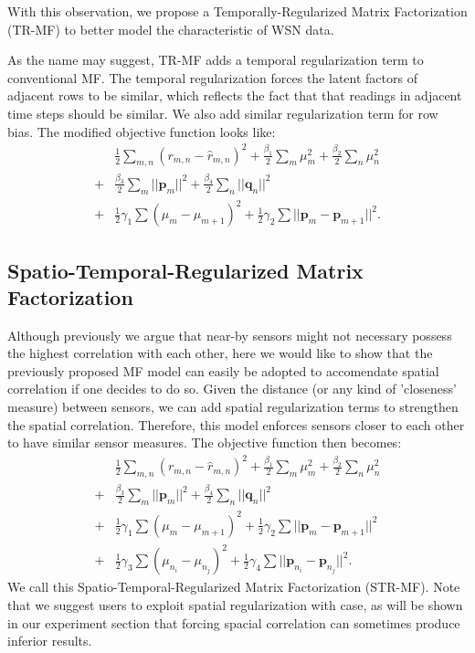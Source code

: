 With this observation, we propose a Temporally-Regularized Matrix Factorization (TR-MF) to better model the characteristic of WSN data. 

As the name may suggest, TR-MF adds a temporal regularization term to conventional MF.
The temporal regularization forces the latent factors of adjacent rows to be similar, which reflects the fact that that readings in adjacent time steps should be similar. We also add similar regularization term for row bias.
The modified objective function looks like: 
\begin{equation*}\begin{aligned}
&\frac{1}{2}\sum_{m,n}{(r_{m,n} - \hat{r}_{m,n})}^2 + \frac{\beta_1}{2}\sum_m{\mu_m^2} + \frac{\beta_2}{2}\sum_n{\mu_n^2}\\
+& \frac{\beta_3}{2}\sum_m{||\mathbf{p}_m||^2} + \frac{\beta_4}{2}\sum_n{||\mathbf{q}_n||^2}\\
+& \frac{1}{2}\gamma_1\sum{(\mu_m-\mu_{m+1})^2} 
+ \frac{1}{2}\gamma_2\sum{||\mathbf{p}_m-\mathbf{p}_{m+1}||^2}.
\end{aligned}\end{equation*}

\subsection{Spatio-Temporal-Regularized Matrix Factorization}
Although previously we argue that near-by sensors might not necessary possess the highest correlation with each other, here we would like to show that the previously proposed MF model can easily be adopted to accomendate spatial correlation if one decides to do so. Given the distance (or any kind of 'closeness' measure) between sensors, we can add spatial regularization terms to strengthen the spatial correlation. Therefore, this model enforces sensors closer to each other to have similar sensor measures. 
The objective function then becomes: 
\begin{equation*}\begin{aligned}
&\frac{1}{2}\sum_{m,n}{(r_{m,n} - \hat{r}_{m,n})}^2 + \frac{\beta_1}{2}\sum_m{\mu_m^2} + \frac{\beta_2}{2}\sum_n{\mu_n^2}\\
+&\frac{\beta_3}{2}\sum_m{||\mathbf{p}_m||^2} + \frac{\beta_4}{2}\sum_n{||\mathbf{q}_n||^2}\\ 
+&\frac{1}{2}\gamma_1\sum{(\mu_m-\mu_{m+1})^2}
+ \frac{1}{2}\gamma_2\sum{||\mathbf{p}_m-\mathbf{p}_{m+1}||^2}\\
+&\frac{1}{2}\gamma_3\sum{(\mu_{n_i}-\mu_{n_j})^2} 
+ \frac{1}{2}\gamma_4\sum{||\mathbf{p}_{n_i}-\mathbf{p}_{n_j}||^2}.
\end{aligned}\end{equation*}
We call this Spatio-Temporal-Regularized Matrix Factorization (STR-MF). Note that we suggest users to exploit spatial regularization with case, as will be shown in our experiment section that forcing spacial correlation can sometimes produce inferior results. 

